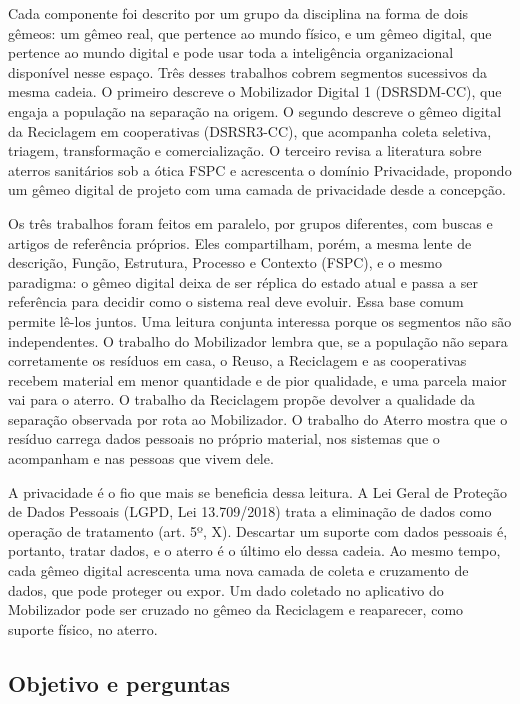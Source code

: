 \documentclass[12pt,a4paper,article,oneside,english,brazil]{abntex2}
\begin{document}
Cada componente foi descrito por um grupo da disciplina na forma de dois gêmeos: um gêmeo real, que pertence ao mundo físico, e um gêmeo digital, que pertence ao mundo digital e pode usar toda a inteligência organizacional disponível nesse espaço. Três desses trabalhos cobrem segmentos sucessivos da mesma cadeia. O primeiro descreve o Mobilizador Digital 1 (DSRSDM-CC), que engaja a população na separação na origem. O segundo descreve o gêmeo digital da Reciclagem em cooperativas (DSRSR3-CC), que acompanha coleta seletiva, triagem, transformação e comercialização. O terceiro revisa a literatura sobre aterros sanitários sob a ótica FSPC e acrescenta o domínio Privacidade, propondo um gêmeo digital de projeto com uma camada de privacidade desde a concepção.

Os três trabalhos foram feitos em paralelo, por grupos diferentes, com buscas e artigos de referência próprios. Eles compartilham, porém, a mesma lente de descrição, Função, Estrutura, Processo e Contexto (FSPC), e o mesmo paradigma: o gêmeo digital deixa de ser réplica do estado atual e passa a ser referência para decidir como o sistema real deve evoluir. Essa base comum permite lê-los juntos. Uma leitura conjunta interessa porque os segmentos não são independentes. O trabalho do Mobilizador lembra que, se a população não separa corretamente os resíduos em casa, o Reuso, a Reciclagem e as cooperativas recebem material em menor quantidade e de pior qualidade, e uma parcela maior vai para o aterro. O trabalho da Reciclagem propõe devolver a qualidade da separação observada por rota ao Mobilizador. O trabalho do Aterro mostra que o resíduo carrega dados pessoais no próprio material, nos sistemas que o acompanham e nas pessoas que vivem dele.

A privacidade é o fio que mais se beneficia dessa leitura. A Lei Geral de Proteção de Dados Pessoais (LGPD, Lei 13.709/2018) trata a eliminação de dados como operação de tratamento (art. 5º, X). Descartar um suporte com dados pessoais é, portanto, tratar dados, e o aterro é o último elo dessa cadeia. Ao mesmo tempo, cada gêmeo digital acrescenta uma nova camada de coleta e cruzamento de dados, que pode proteger ou expor. Um dado coletado no aplicativo do Mobilizador pode ser cruzado no gêmeo da Reciclagem e reaparecer, como suporte físico, no aterro.

\subsection{Objetivo e perguntas}
\end{document}
